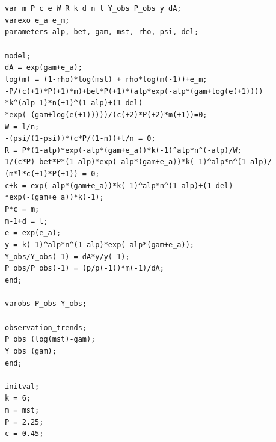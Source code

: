 \texttt{var m P c e W R k d n l Y\_obs P\_obs y dA; \\
varexo e\_a e\_m;\\
parameters alp, bet, gam, mst, rho, psi, del;\\
\\
model;\\
dA = exp(gam+e\_a);\\
log(m) = (1-rho)*log(mst) + rho*log(m(-1))+e\_m;\\
-P/(c(+1)*P(+1)*m)+bet*P(+1)*(alp*exp(-alp*(gam+log(e(+1))))\\
*k\textasciicircum (alp-1)*n(+1)\textasciicircum (1-alp)+(1-del)\\
*exp(-(gam+log(e(+1)))))/(c(+2)*P(+2)*m(+1))=0;\\
W = l/n;\\
-(psi/(1-psi))*(c*P/(1-n))+l/n = 0;\\
R = P*(1-alp)*exp(-alp*(gam+e\_a))*k(-1)\textasciicircum alp*n\textasciicircum (-alp)/W;\\
1/(c*P)-bet*P*(1-alp)*exp(-alp*(gam+e\_a))*k(-1)\textasciicircum alp*n\textasciicircum (1-alp)/\\(m*l*c(+1)*P(+1)) = 0;\\
c+k = exp(-alp*(gam+e\_a))*k(-1)\textasciicircum alp*n\textasciicircum (1-alp)+(1-del)\\*exp(-(gam+e\_a))*k(-1);\\
P*c = m;\\
m-1+d = l;\\
e = exp(e\_a);\\
y = k(-1)\textasciicircum alp*n\textasciicircum (1-alp)*exp(-alp*(gam+e\_a));\\
Y\_obs/Y\_obs(-1) = dA*y/y(-1);\\
P\_obs/P\_obs(-1) = (p/p(-1))*m(-1)/dA;\\
end;\\
\\
varobs P\_obs Y\_obs;\\
\\
observation\_trends;\\
P\_obs (log(mst)-gam);\\
Y\_obs (gam);\\
end;\\
\\
initval;\\
k = 6;\\
m = mst;\\
P = 2.25;\\
c = 0.45;\\
}
